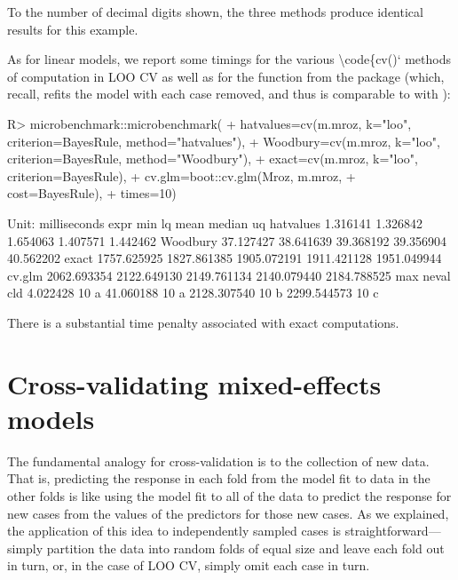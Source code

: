 \documentclass[
]{jss}
\begin{document}
To the number of decimal digits shown, the three methods produce
identical results for this example.

As for linear models, we report some timings for the various
\textbackslash code\{cv()` methods of computation in LOO CV as well as
for the  function from the  package (which,
recall, refits the model with each case removed, and thus is comparable
to  with ):

\begin{CodeChunk}
\begin{CodeInput}
R> microbenchmark::microbenchmark(
+   hatvalues=cv(m.mroz, k="loo", criterion=BayesRule, method="hatvalues"),
+   Woodbury=cv(m.mroz, k="loo", criterion=BayesRule, method="Woodbury"),
+   exact=cv(m.mroz, k="loo", criterion=BayesRule),
+   cv.glm=boot::cv.glm(Mroz, m.mroz,
+                cost=BayesRule),
+   times=10)
\end{CodeInput}
\begin{CodeOutput}
Unit: milliseconds
      expr         min          lq        mean      median          uq
 hatvalues    1.316141    1.326842    1.654063    1.407571    1.442462
  Woodbury   37.127427   38.641639   39.368192   39.356904   40.562202
     exact 1757.625925 1827.861385 1905.072191 1911.421128 1951.049944
    cv.glm 2062.693354 2122.649130 2149.761134 2140.079440 2184.788525
         max neval cld
    4.022428    10 a  
   41.060188    10 a  
 2128.307540    10  b 
 2299.544573    10   c
\end{CodeOutput}
\end{CodeChunk}

There is a substantial time penalty associated with exact computations.

\hypertarget{cross-validating-mixed-effects-models}{%
\section{Cross-validating mixed-effects
models}\label{cross-validating-mixed-effects-models}}

The fundamental analogy for cross-validation is to the collection of new
data. That is, predicting the response in each fold from the model fit
to data in the other folds is like using the model fit to all of the
data to predict the response for new cases from the values of the
predictors for those new cases. As we explained, the application of this
idea to independently sampled cases is straightforward---simply
partition the data into random folds of equal size and leave each fold
out in turn, or, in the case of LOO CV, simply omit each case in turn.
\end{document}
